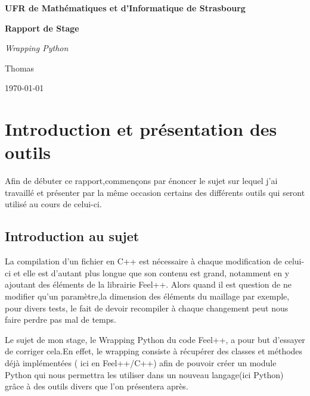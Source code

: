 \documentclass[french,12pt]{article}
\author{Thomas \bsc{Lantz}}
\begin{document}
\begin{titlepage}
\begin{center}
  \Huge
  \textbf{UFR de Mathématiques et d'Informatique de Strasbourg}
  \par \vspace{2 cm}
  \textbf{Rapport de Stage}
  \par \vspace{1 cm}
  \emph{Wrapping Python}
  \par \vspace{5 cm}
   Thomas
  \par \vspace{3 cm}
  \normalsize{\today}\\
  \end{center}
\end{titlepage}

\newpage
\tableofcontents
\newpage

\section{Introduction et présentation des outils}

Afin de débuter ce rapport,commençons par énoncer le sujet sur lequel j'ai travaillé et présenter par la même occasion certains des différents outils qui seront utilisé au cours de celui-ci.

\subsection{Introduction au sujet}

La compilation d'un fichier en C++ est nécessaire à chaque modification de celui-ci et elle est d'autant plus longue que son contenu est grand, notamment en y ajoutant des éléments de la librairie Feel++. Alors quand il est question de ne modifier qu'un paramètre,la dimension des éléments du maillage par exemple, pour divers tests, le fait de devoir recompiler à chaque changement peut nous faire perdre pas mal de temps.
\newline

Le sujet de mon stage, le Wrapping Python du code Feel++, a pour but d'essayer de corriger cela.En effet, le wrapping consiste à récupérer des classes et méthodes déjà implémentées ( ici en Feel++/C++) afin de pouvoir créer un module Python qui nous permettra les utiliser dans un nouveau langage(ici Python) grâce à des outils divers que l'on présentera après.
\newline
\end{document}
